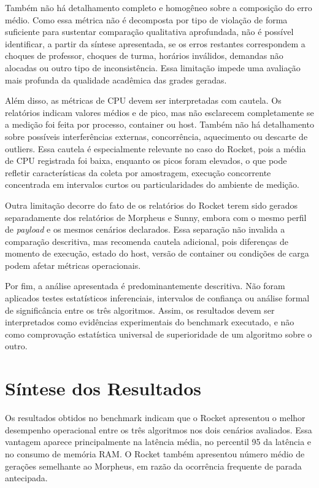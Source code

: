 Também não há detalhamento completo e homogêneo sobre a composição do erro médio. Como essa métrica não é decomposta por tipo de violação de forma suficiente para sustentar comparação qualitativa aprofundada, não é possível identificar, a partir da síntese apresentada, se os erros restantes correspondem a choques de professor, choques de turma, horários inválidos, demandas não alocadas ou outro tipo de inconsistência. Essa limitação impede uma avaliação mais profunda da qualidade acadêmica das grades geradas.

Além disso, as métricas de CPU devem ser interpretadas com cautela. Os relatórios indicam valores médios e de pico, mas não esclarecem completamente se a medição foi feita por processo, container ou host. Também não há detalhamento sobre possíveis interferências externas, concorrência, aquecimento ou descarte de outliers. Essa cautela é especialmente relevante no caso do Rocket, pois a média de CPU registrada foi baixa, enquanto os picos foram elevados, o que pode refletir características da coleta por amostragem, execução concorrente concentrada em intervalos curtos ou particularidades do ambiente de medição.

Outra limitação decorre do fato de os relatórios do Rocket terem sido gerados separadamente dos relatórios de Morpheus e Sunny, embora com o mesmo perfil de \textit{payload} e os mesmos cenários declarados. Essa separação não invalida a comparação descritiva, mas recomenda cautela adicional, pois diferenças de momento de execução, estado do host, versão de container ou condições de carga podem afetar métricas operacionais.

Por fim, a análise apresentada é predominantemente descritiva. Não foram aplicados testes estatísticos inferenciais, intervalos de confiança ou análise formal de significância entre os três algoritmos. Assim, os resultados devem ser interpretados como evidências experimentais do benchmark executado, e não como comprovação estatística universal de superioridade de um algoritmo sobre o outro.

\section{Síntese dos Resultados}
\label{sec:sintese-resultados}

Os resultados obtidos no benchmark indicam que o Rocket apresentou o melhor desempenho operacional entre os três algoritmos nos dois cenários avaliados. Essa vantagem aparece principalmente na latência média, no percentil 95 da latência e no consumo de memória RAM. O Rocket também apresentou número médio de gerações semelhante ao Morpheus, em razão da ocorrência frequente de parada antecipada.

